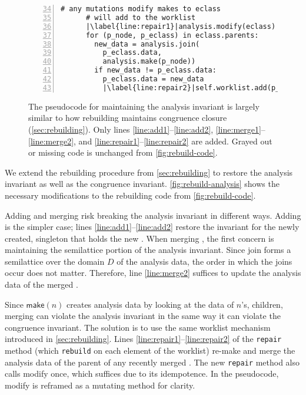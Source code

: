 \begin{figure}
\begin{minipage}[t]{0.47\linewidth}
\begin{lstlisting}[gobble=4, numbers=left, firstnumber=34, basicstyle=\scriptsize\ttfamily, escapechar=|,
    numbersep=5pt,
]
      # any mutations modify makes to eclass
      # will add to the worklist
      |\label{line:repair1}|analysis.modify(eclass)
      for (p_node, p_eclass) in eclass.parents:
        new_data = analysis.join(
          p_eclass.data,
          analysis.make(p_node))
        if new_data != p_eclass.data:
          p_eclass.data = new_data
          |\label{line:repair2}|self.worklist.add(p_eclass)
    \end{lstlisting}
  \end{minipage}
  \caption{
    The pseudocode for maintaining the \eclass analysis invariant is largely
      similar to how rebuilding maintains congruence closure
      (\autoref{sec:rebuilding}).
    Only lines \ref{line:add1}--\ref{line:add2},
      \ref{line:merge1}--\ref{line:merge2},
      and \ref{line:repair1}--\ref{line:repair2} are added.
    Grayed out or missing code is unchanged from \autoref{fig:rebuild-code}.
  }
  \label{fig:rebuild-analysis}
\end{figure}

We extend the rebuilding procedure from \autoref{sec:rebuilding} to restore the
  analysis invariant as well as the congruence invariant.
\autoref{fig:rebuild-analysis} shows the necessary modifications to the
  rebuilding code from \autoref{fig:rebuild-code}.

Adding \enodes and merging \eclasses risk breaking the analysis invariant in
  different ways.
Adding \enodes is the simpler case; lines \ref{line:add1}--\ref{line:add2}
  restore the invariant for the newly created, singleton \eclass that holds the
  new \enode.
When merging \enodes, the first concern is maintaining the semilattice portion of the
  analysis invariant.
Since \textsf{join} forms a semilattice over the domain $D$ of the analysis
  data, the order in which the joins occur does not matter.
Therefore, line \ref{line:merge2} suffices to update the analysis data of the
  merged \eclass.

Since $\textsf{make}(n)$ creates analysis data by looking at the data of $n$'s,
  children, merging \eclasses can violate the analysis invariant in the same way
  it can violate the congruence invariant.
The solution is to use the same worklist mechanism introduced in
  \autoref{sec:rebuilding}.
Lines \ref{line:repair1}--\ref{line:repair2} of the \texttt{repair} method
  (which \texttt{rebuild} on each element of the worklist)
  re-\textsf{make} and \textsf{merge} the analysis data of the parent of any
  recently merged \eclasses.
The new \texttt{repair} method also calls \textsf{modify} once, which suffices
  due to its idempotence.
In the pseudocode, \textsf{modify} is reframed as a mutating method for clarity.

